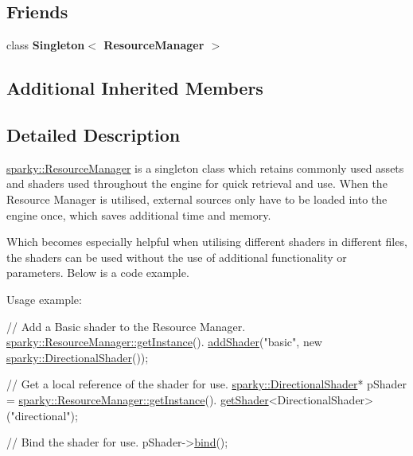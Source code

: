 \subsection*{Friends}
\begin{DoxyCompactItemize}
\item 
class {\bfseries Singleton$<$ Resource\+Manager $>$}\hypertarget{classsparky_1_1_resource_manager_a8cc0c523af7e6e454ed0f273b5f18e4a}{}\label{classsparky_1_1_resource_manager_a8cc0c523af7e6e454ed0f273b5f18e4a}

\end{DoxyCompactItemize}
\subsection*{Additional Inherited Members}


\subsection{Detailed Description}
\hyperlink{classsparky_1_1_resource_manager}{sparky\+::\+Resource\+Manager} is a singleton class which retains commonly used assets and shaders used throughout the engine for quick retrieval and use. When the Resource Manager is utilised, external sources only have to be loaded into the engine once, which saves additional time and memory.

Which becomes especially helpful when utilising different shaders in different files, the shaders can be used without the use of additional functionality or parameters. Below is a code example.

Usage example\+: 
\begin{DoxyCode}
\textcolor{comment}{// Add a Basic shader to the Resource Manager.}
\hyperlink{classsparky_1_1_singleton_a8e56848cf24e5f4cdcd493c64d576f10}{sparky::ResourceManager::getInstance}().
      \hyperlink{classsparky_1_1_resource_manager_aadcd7a39dafd4d1d7dcfc8c2cc2735d2}{addShader}(\textcolor{stringliteral}{"basic"}, \textcolor{keyword}{new} \hyperlink{classsparky_1_1_directional_shader}{sparky::DirectionalShader}());

\textcolor{comment}{// Get a local reference of the shader for use.}
\hyperlink{classsparky_1_1_directional_shader}{sparky::DirectionalShader}* pShader = 
      \hyperlink{classsparky_1_1_singleton_a8e56848cf24e5f4cdcd493c64d576f10}{sparky::ResourceManager::getInstance}().
      \hyperlink{classsparky_1_1_resource_manager_a8d48e497254410edf301df3d08248520}{getShader}<DirectionalShader>(\textcolor{stringliteral}{"directional"});

\textcolor{comment}{// Bind the shader for use.}
pShader->\hyperlink{classsparky_1_1_i_shader_component_a6ed7ff5dbe96d0fb5bc8f3e53e110e1a}{bind}();
\end{DoxyCode}
 

